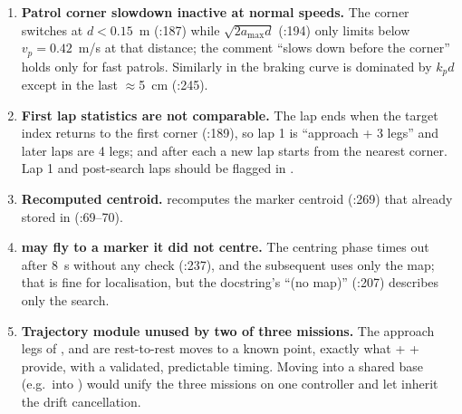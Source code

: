 \begin{review}
\begin{enumerate}[leftmargin=*]
        (:144--148), which  (and ) treat as
        ``no key''. Space or  work; Esc is silently ignored.
  \item \textbf{Patrol corner slowdown inactive at normal speeds.} The corner switches at $d < 0.15$~m
        (:187) while $\sqrt{2a_{\max}d}$ (:194) only limits below
        $v_p = 0.42$~m/s at that distance; the comment ``slows down before the corner'' holds only for fast
        patrols. Similarly in  the braking curve is dominated by $k_p d$ except in the last
        $\approx$5~cm (:245).
  \item \textbf{First lap statistics are not comparable.} The lap ends when the target index returns to the
        first corner (:189), so lap 1 is ``approach + 3 legs'' and later laps are 4 legs; and
        after each  a new lap starts from the nearest corner. Lap 1 and post-search laps should be
        flagged in .
  \item \textbf{Recomputed centroid.}  recomputes the marker centroid (:269)
        that  already stored in  (:69--70).
  \item \textbf{ may fly to a marker it did not centre.} The centring phase times out after 8~s
        without any check (:237), and the subsequent  uses only the map; that is fine
        for localisation, but the docstring's ``(no map)'' (:207) describes only the search.
  \item \textbf{Trajectory module unused by two of three missions.} The approach legs of ,
         and  are rest-to-rest moves to a known point, exactly what
         +  +  provide, with a validated, predictable timing. Moving
         into a shared base (e.g.\ into ) would unify the three missions on one
        controller and let  inherit the drift cancellation.
\end{enumerate}
\end{review}
